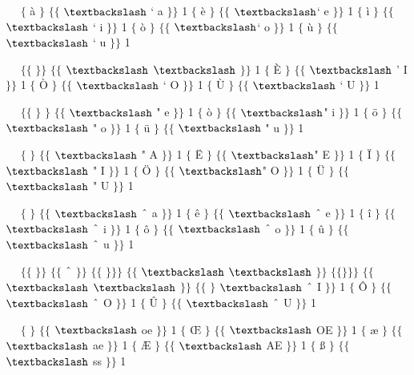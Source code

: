 ~~ $ \{ $ à $ \} $ $ \{ $$ \{ $ $\textbackslash$ ` a $ \} $$ \} $ 1 $ \{ $ è $ \} $ $ \{ $$ \{ $ $\textbackslash$` e $ \} $$ \} $ 1 $ \{ $ ì $ \} $ $ \{ $$ \{ $ $\textbackslash$ ` i $ \} $$ \} $ 1 $ \{ $ ò $ \} $ $ \{ $$ \{ $ $\textbackslash$` o $ \} $$ \} $ 1 $ \{ $ ù $ \} $ $ \{ $$ \{ $ $\textbackslash$ ` u $ \} $$ \} $ 1\par

~~ $ \{ $$ \{ $ $ \} $$ \} $ $ \{ $$ \{ $ $\textbackslash$ $\textbackslash$ $ \} $$ \} $ 1 $ \{ $ È $ \} $ $ \{ $$ \{ $ $\textbackslash$ ' I $ \} $$ \} $ 1 $ \{ $ Ò $ \} $ $ \{ $$ \{ $ $\textbackslash$ ` O $ \} $$ \} $ 1 $ \{ $ Ù $ \} $ $ \{ $$ \{ $ $\textbackslash$ ` U $ \} $$ \} $ 1\par

~~ $ \{ $$ \{ $ $ \} $ $ \} $ $ \{ $$ \{ $ $\textbackslash$ " e $ \} $$ \} $ 1 $ \{ $ ò $ \} $ $ \{ $$ \{ $ $\textbackslash$" i $ \} $$ \} $ 1 $ \{ $ ö $ \} $ $ \{ $$ \{ $ $\textbackslash$ " o $ \} $$ \} $ 1 $ \{ $ ü $ \} $ $ \{ $$ \{ $ $\textbackslash$ " u $ \} $$ \} $ 1\par

~~ $ \{ $ $ \} $ $ \{ $$ \{ $ $\textbackslash$ " A $ \} $$ \} $ 1 $ \{ $ Ë $ \} $ $ \{ $$ \{ $ $\textbackslash$" E $ \} $$ \} $ 1 $ \{ $ Ï $ \} $ $ \{ $$ \{ $ $\textbackslash$ " I $ \} $$ \} $ 1 $ \{ $ Ö $ \} $ $ \{ $$ \{ $ $\textbackslash$" O $ \} $$ \} $ 1 $ \{ $ Ü $ \} $ $ \{ $$ \{ $ $\textbackslash$ " U $ \} $$ \} $ 1\par

~~ $ \{ $ $ \} $ $ \{ $$ \{ $ $\textbackslash$ $ \string^ $ a $ \} $$ \} $ 1 $ \{ $ ê $ \} $ $ \{ $$ \{ $ $\textbackslash$ $ \string^ $ e $ \} $$ \} $ 1 $ \{ $ î $ \} $ $ \{ $$ \{ $ $\textbackslash$ $ \string^ $ i $ \} $$ \} $ 1 $ \{ $ ô $ \} $ $ \{ $$ \{ $ $\textbackslash$ $ \string^ $ o $ \} $$ \} $ 1 $ \{ $ û $ \} $ $ \{ $$ \{ $ $\textbackslash$ $ \string^ $ u $ \} $$ \} $ 1\par

~~ $ \{ $$ \{ $ $ \} $$ \} $ $ \{ $$ \{ $ $ \string^ $ $ \} $$ \} $ $ \{ $$ \{ $ $ \} $$ \} $$ \} $ $ \{ $$ \{ $ $\textbackslash$ $\textbackslash$ $ \} $$ \} $ $ \{ $$ \{ $$ \} $$ \} $$ \} $ $ \{ $$ \{ $ $\textbackslash$ $\textbackslash$ $ \} $$ \} $ $ \{ $$ \{ $ $ \} $ $\textbackslash$ $ \string^ $ I $ \} $$ \} $ 1 $ \{ $ Ô $ \} $ $ \{ $$ \{ $ $\textbackslash$ $ \string^ $ O $ \} $$ \} $ 1 $ \{ $ Û $ \} $ $ \{ $$ \{ $ $\textbackslash$ $ \string^ $ U $ \} $$ \} $ 1\par

~~ $ \{ $ $ \} $ $ \{ $$ \{ $ $\textbackslash$ oe $ \} $$ \} $ 1 $ \{ $ Œ $ \} $ $ \{ $$ \{ $ $\textbackslash$ OE $ \} $$ \} $ 1 $ \{ $ æ $ \} $ $ \{ $$ \{ $ $\textbackslash$ ae $ \} $$ \} $ 1 $ \{ $ Æ $ \} $ $ \{ $$ \{ $ $\textbackslash$ AE $ \} $$ \} $ 1 $ \{ $ ß $ \} $ $ \{ $$ \{ $ $\textbackslash$ ss $ \} $$ \} $ 1\par

